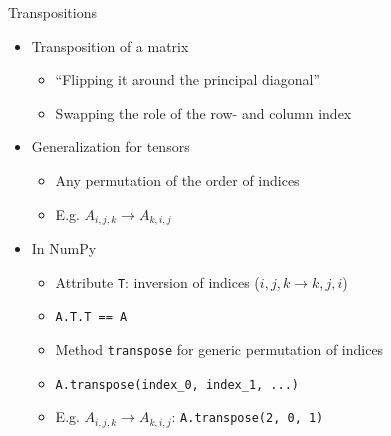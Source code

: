 \begin{frame}[fragile]{Transpositions}
%
\begin{itemize}
\item Transposition of a matrix
	\begin{itemize}
	\item \enquote{Flipping it around the principal diagonal}
	\item Swapping the role of the row- and column index
	\end{itemize}
\item Generalization for tensors
	\begin{itemize}
	\item Any permutation of the order of indices
	\item E.\;g. $A_{i, j, k} \to A_{k, i, j}$
	\end{itemize}
\item In NumPy
	\begin{itemize}
	\item Attribute \texttt{T}: inversion of indices ($i, j, k \to k, j, i$)
	\item \texttt{A.T.T == A}
	\item Method \texttt{transpose} for generic permutation of indices
	\item \texttt{A.transpose(index\_0, index\_1, ...)}
	\item E.\;g. $A_{i, j, k} \to A_{k, i, j}$: \texttt{A.transpose(2, 0, 1)}
	\end{itemize}
\end{itemize}
%
\end{frame}

